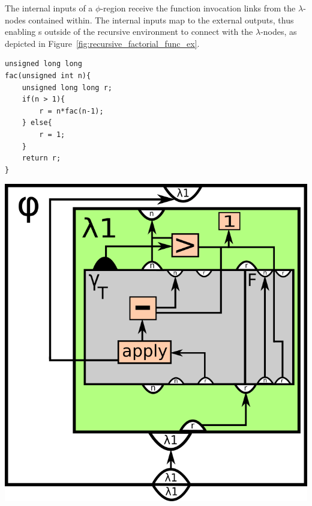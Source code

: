 \begin{itemize}
The internal inputs of a $\phi$-region receive the function invocation links
from the $\lambda$-nodes contained within. The internal inputs map to the
external outputs, thus enabling \applyNode s outside of the recursive
environment to connect with the $\lambda$-nodes, as depicted in
Figure~\ref{fig:recursive_factorial_func_ex}.

\begin{centering}
	\noindent\begin{minipage}{0.37\textwidth}
		\begin{CenteredBox}
		\begin{lstlisting}[label={lst:recursive_factorial_func_ex},
style=minipage_customcpp]
unsigned long long
fac(unsigned int n){
	unsigned long long r;
	if(n > 1){
		r = n*fac(n-1);
	} else{
		r = 1;
	}
	return r;
}
		\end{lstlisting}
		\end{CenteredBox}
	\end{minipage}
	\noindent\begin{minipage}{0.55\textwidth}
		\captionsetup{type=figure}
		\includegraphics[width=\textwidth]{figures/recursive_factorial_func_ex}
	\end{minipage}
	\label{fig:recursive_factorial_func_ex}
\end{centering}

\end{itemize}
